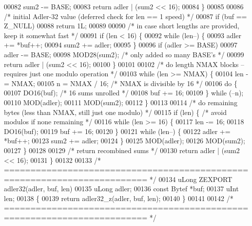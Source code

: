 \begin{DoxyCode}
{{{{00082             sum2 -= BASE;
00083         \textcolor{keywordflow}{return} adler | (sum2 << 16);
00084     \}
00085 
00086     \textcolor{comment}{/* initial Adler-32 value (deferred check for len == 1 speed) */}
00087     \textcolor{keywordflow}{if} (buf == Z\_NULL)
00088         \textcolor{keywordflow}{return} 1L;
00089 
00090     \textcolor{comment}{/* in case short lengths are provided, keep it somewhat fast */}
00091     \textcolor{keywordflow}{if} (len < 16) \{
00092         \textcolor{keywordflow}{while} (len--) \{
00093             adler += *buf++;
00094             sum2 += adler;
00095         \}
00096         \textcolor{keywordflow}{if} (adler >= BASE)
00097             adler -= BASE;
00098         MOD28(sum2);            \textcolor{comment}{/* only added so many BASE's */}
00099         \textcolor{keywordflow}{return} adler | (sum2 << 16);
00100     \}
00101 
00102     \textcolor{comment}{/* do length NMAX blocks -- requires just one modulo operation */}
00103     \textcolor{keywordflow}{while} (len >= NMAX) \{
00104         len -= NMAX;
00105         n = NMAX / 16;          \textcolor{comment}{/* NMAX is divisible by 16 */}
00106         \textcolor{keywordflow}{do} \{
00107             DO16(buf);          \textcolor{comment}{/* 16 sums unrolled */}
00108             buf += 16;
00109         \} \textcolor{keywordflow}{while} (--n);
00110         MOD(adler);
00111         MOD(sum2);
00112     \}
00113 
00114     \textcolor{comment}{/* do remaining bytes (less than NMAX, still just one modulo) */}
00115     \textcolor{keywordflow}{if} (len) \{                  \textcolor{comment}{/* avoid modulos if none remaining */}
00116         \textcolor{keywordflow}{while} (len >= 16) \{
00117             len -= 16;
00118             DO16(buf);
00119             buf += 16;
00120         \}
00121         \textcolor{keywordflow}{while} (len--) \{
00122             adler += *buf++;
00123             sum2 += adler;
00124         \}
00125         MOD(adler);
00126         MOD(sum2);
00127     \}
00128 
00129     \textcolor{comment}{/* return recombined sums */}
00130     \textcolor{keywordflow}{return} adler | (sum2 << 16);
00131 \}
00132 
00133 \textcolor{comment}{/* ========================================================================= */}
00134 uLong ZEXPORT adler32(adler, buf, len)
00135     uLong adler;
00136     \textcolor{keyword}{const} Bytef *buf;
00137     uInt len;
00138 \{
00139     \textcolor{keywordflow}{return} adler32\_z(adler, buf, len);
00140 \}
00141 
00142 \textcolor{comment}{/* ========================================================================= */}
}}}}
\end{DoxyCode}
